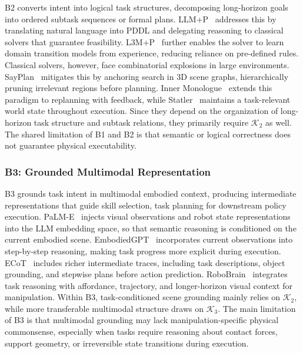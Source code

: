 \documentclass[acmsmall,screen,review]{acmart}
\begin{document}
B2 converts intent into logical task structures, decomposing long-horizon goals into ordered subtask sequences or formal plans. 
LLM+P~\cite{liu2023llmp} addresses this by translating natural language into PDDL and delegating reasoning to classical solvers that guarantee feasibility. 
L3M+P~\cite{agarwal2025l3mp} further enables the solver to learn domain transition models from experience, reducing reliance on pre-defined rules.  
Classical solvers, however, face combinatorial explosions in large environments. SayPlan~\cite{rana2023sayplan} mitigates this by anchoring search in 3D scene graphs, hierarchically pruning irrelevant regions before planning.
Inner Monologue~\cite{huang2023inner} extends this paradigm to replanning with feedback, while Statler~\cite{yoneda2024statler} maintains a task-relevant world state throughout execution.
Since they depend on the organization of long-horizon task structure and subtask relations, they primarily require \(\mathcal{K}_2\) as well.
The shared limitation of B1 and B2 is that semantic or logical correctness does not guarantee physical executability.

\subsubsection{B3: Grounded Multimodal Representation}\label{sec:multimodal_reasoning}

B3 grounds task intent in multimodal embodied context, producing intermediate representations that guide skill selection, task planning for downstream policy execution.
PaLM-E~\cite{driess2023palme} injects visual observations and robot state representations into the LLM embedding space, so that semantic reasoning is conditioned on the current embodied scene.
EmbodiedGPT~\cite{mu2023embodiedgpt} incorporates current observations into step-by-step reasoning, making task progress more explicit during execution.
ECoT~\cite{zawalski2025ecot} includes richer intermediate traces, including task descriptions, object grounding, and stepwise plans before action prediction.
RoboBrain~\cite{ji2025robobrain} integrates task reasoning with affordance, trajectory, and longer-horizon visual context for manipulation.
Within B3, task-conditioned scene grounding mainly relies on \(\mathcal{K}_2\), while more transferable multimodal structure draws on \(\mathcal{K}_3\).
The main limitation of B3 is that multimodal grounding may lack manipulation-specific physical commonsense, especially when tasks require reasoning about contact forces, support geometry, or irreversible state transitions during execution.
\end{document}
